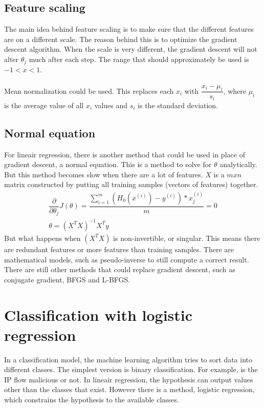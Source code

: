 \subsection{Feature scaling}
The main idea behind feature scaling is to make sure that the different features are on a different scale. The reason behind this is to optimize the gradient descent algorithm. When the scale is very different, the gradient descent will not alter $\theta_j$ much after each step. The range that should approximately be used is $-1 < x < 1$. \\
\\
Mean normalization could be used. This replaces each $x_i$ with $\dfrac{x_i - \mu_i}{s_i}$, where $\mu_i$ is the average value of all $x_i$ values and $s_i$ is the standard deviation.

\subsection{Normal equation}
For lineair regression, there is another method that could be used in place of gradient descent, a normal equation. This is a method to solve for $\theta$ analytically. But this method becomes slow when there are a lot of features. $X$ is a $m x n$ matrix constructed by putting all training samples (vectors of features) together. 
 \begin{gather}
 \dfrac{\partial}{\partial \theta_j}J(\theta) =  \dfrac{\sum\limits_{i=1}^m(H_0(x^{(i)}) - y^{(i)}) * x_j^{(i)}}{m} = 0\\
  \theta =  (X^TX)^{-1}X^Ty
  \end{gather}
But what happens when $(X^TX)$ is non-invertible, or singular. This means there are redundant features or more features than training samples. There are mathematical models, such as pseudo-inverse to still compute a correct result. There are still other methods that could replace gradient descent, such as conjugate gradient, BFGS and L-BFGS.

\section{Classification with logistic regression}
In a classification model, the machine learning algorithm tries to sort data into different classes. The simplest version is binary classification. For example, is the IP flow malicious or not. In lineair regression, the hypothesis can output values other than the classes that exist. However there is a method, logistic regression, which constrains the hypothesis to the available classes.

